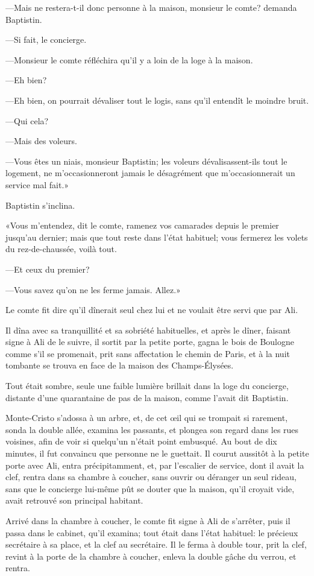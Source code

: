 —Mais ne restera-t-il donc personne à la maison, monsieur le comte? demanda Baptistin. 

—Si fait, le concierge. 

—Monsieur le comte réfléchira qu'il y a loin de la loge à la maison. 

—Eh bien? 

—Eh bien, on pourrait dévaliser tout le logis, sans qu'il entendît le moindre bruit. 

—Qui cela? 

—Mais des voleurs. 

—Vous êtes un niais, monsieur Baptistin; les voleurs dévalisassent-ils tout le logement, ne m'occasionneront jamais le désagrément que m'occasionnerait un service mal fait.» 

Baptistin s'inclina. 

«Vous m'entendez, dit le comte, ramenez vos camarades depuis le premier jusqu'au dernier; mais que tout reste dans l'état habituel; vous fermerez les volets du rez-de-chaussée, voilà tout. 

—Et ceux du premier? 

—Vous savez qu'on ne les ferme jamais. Allez.» 

Le comte fit dire qu'il dînerait seul chez lui et ne voulait être servi que par Ali. 

Il dîna avec sa tranquillité et sa sobriété habituelles, et après le dîner, faisant signe à Ali de le suivre, il sortit par la petite porte, gagna le bois de Boulogne comme s'il se promenait, prit sans affectation le chemin de Paris, et à la nuit tombante se trouva en face de la maison des Champs-Élysées. 

Tout était sombre, seule une faible lumière brillait dans la loge du concierge, distante d'une quarantaine de pas de la maison, comme l'avait dit Baptistin. 

Monte-Cristo s'adossa à un arbre, et, de cet œil qui se trompait si rarement, sonda la double allée, examina les passants, et plongea son regard dans les rues voisines, afin de voir si quelqu'un n'était point embusqué. Au bout de dix minutes, il fut convaincu que personne ne le guettait. Il courut aussitôt à la petite porte avec Ali, entra précipitamment, et, par l'escalier de service, dont il avait la clef, rentra dans sa chambre à coucher, sans ouvrir ou déranger un seul rideau, sans que le concierge lui-même pût se douter que la maison, qu'il croyait vide, avait retrouvé son principal habitant. 

Arrivé dans la chambre à coucher, le comte fit signe à Ali de s'arrêter, puis il passa dans le cabinet, qu'il examina; tout était dans l'état habituel: le précieux secrétaire à sa place, et la clef au secrétaire. Il le ferma à double tour, prit la clef, revint à la porte de la chambre à coucher, enleva la double gâche du verrou, et rentra. 

